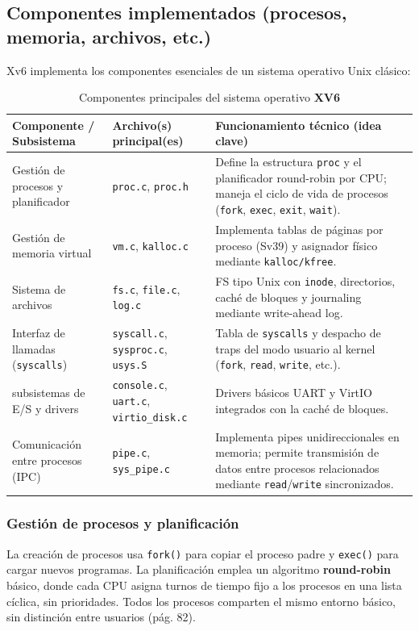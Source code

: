 \subsection{Componentes implementados (procesos, memoria, archivos, etc.)}
Xv6 implementa los componentes esenciales de un sistema operativo Unix clásico:
\begin{table}[H]
\centering
\caption{Componentes principales del sistema operativo \textbf{XV6}}
\label{tab:xv6-componentes}
\begin{tabular}{|p{4cm}|p{4cm}|p{7cm}|}
\hline
\textbf{Componente / Subsistema} & \textbf{Archivo(s) principal(es)} & \textbf{Funcionamiento técnico (idea clave)} \\ \hline
Gestión de procesos y planificador & \texttt{proc.c}, \texttt{proc.h} & Define la estructura \texttt{proc} y el planificador round-robin por CPU; maneja el ciclo de vida de procesos (\texttt{fork}, \texttt{exec}, \texttt{exit}, \texttt{wait}). \\ \hline
Gestión de memoria virtual & \texttt{vm.c}, \texttt{kalloc.c} & Implementa tablas de páginas por proceso (Sv39) y asignador físico mediante \texttt{kalloc/kfree}. \\ \hline
Sistema de archivos & \texttt{fs.c}, \texttt{file.c}, \texttt{log.c} & FS tipo Unix con \texttt{inode}, directorios, caché de bloques y journaling mediante write-ahead log. \\ \hline
Interfaz de llamadas (\texttt{syscalls}) & \texttt{syscall.c}, \texttt{sysproc.c}, \texttt{usys.S} & Tabla de \texttt{syscalls} y despacho de traps del modo usuario al kernel (\texttt{fork}, \texttt{read}, \texttt{write}, etc.). \\ \hline
subsistemas de E/S y drivers & \texttt{console.c}, \texttt{uart.c}, \texttt{virtio\_disk.c} & Drivers básicos UART y VirtIO integrados con la caché de bloques. \\ \hline
Comunicación entre procesos (IPC) & \texttt{pipe.c}, \texttt{sys\_pipe.c} & Implementa pipes unidireccionales en memoria; permite transmisión de datos entre procesos relacionados mediante \texttt{read}/\texttt{write} sincronizados. \\ \hline
\end{tabular}
\end{table}

\subsubsection*{Gestión de procesos y planificación}
La creación de procesos usa \texttt{fork()} para copiar el proceso padre y \texttt{exec()} para cargar nuevos programas. La planificación emplea un algoritmo \textbf{round-robin} básico, donde cada CPU asigna turnos de tiempo fijo a los procesos en una lista cíclica, sin prioridades. Todos los procesos comparten el mismo entorno básico, sin distinción entre usuarios \citep{xv6_mit} (pág. 82).

